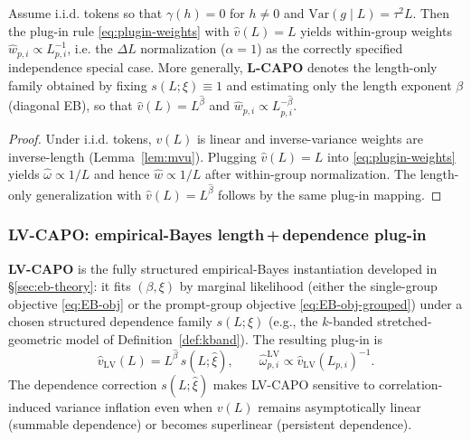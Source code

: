 \begin{proposition}\label{prop:lcapo-independence}
Assume i.i.d. tokens so that $\gamma(h)=0$ for $h\ne 0$ and $\mathrm{Var}(g\mid L)=\tau^2 L$. Then the plug-in rule \eqref{eq:plugin-weights} with $\widehat v(L)=L$ yields within-group weights $\widehat w_{p,i}\propto L_{p,i}^{-1}$, i.e. the $\Delta L$ normalization ($\alpha=1$) as the correctly specified independence special case.
More generally, \textbf{L-CAPO} denotes the length-only family obtained by fixing $s(L;\xi)\equiv 1$ and estimating only the length exponent $\beta$ (diagonal EB), so that $\widehat v(L)=L^{\widehat\beta}$ and $\widehat w_{p,i}\propto L_{p,i}^{-\widehat\beta}$.
\end{proposition}
\begin{proof}
Under i.i.d. tokens, $v(L)$ is linear and inverse-variance weights are inverse-length (Lemma~\ref{lem:mvu}). Plugging $\widehat v(L)=L$ into \eqref{eq:plugin-weights} yields $\widehat\omega\propto 1/L$ and hence $\widehat w\propto 1/L$ after within-group normalization.
The length-only generalization with $\widehat v(L)=L^{\widehat\beta}$ follows by the same plug-in mapping.
\end{proof}

\subsubsection{LV-CAPO: empirical-Bayes length\,+\,dependence plug-in}\label{subsec:lvcapo-plugin}
\textbf{LV-CAPO} is the fully structured empirical-Bayes instantiation developed in \S\ref{sec:eb-theory}: it fits $(\beta,\xi)$ by marginal likelihood (either the single-group objective \eqref{eq:EB-obj} or the prompt-group objective \eqref{eq:EB-obj-grouped}) under a chosen structured dependence family $s(L;\xi)$ (e.g., the $k$-banded stretched-geometric model of Definition~\ref{def:kband}). The resulting plug-in is
\begin{equation}
\widehat v_{\mathrm{LV}}(L)=L^{\widehat\beta}\,s(L;\widehat\xi),\qquad \widehat\omega_{p,i}^{\mathrm{LV}}\propto \widehat v_{\mathrm{LV}}(L_{p,i})^{-1}.
\end{equation}
The dependence correction $s(L;\widehat\xi)$ makes LV-CAPO sensitive to correlation-induced variance inflation even when $v(L)$ remains asymptotically linear (summable dependence) or becomes superlinear (persistent dependence).

